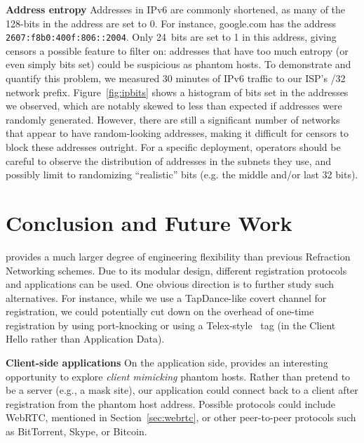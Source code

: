 \documentclass[sigconf]{acmart}
\renewcommand{\paragraph}[1]{\smallskip\noindent\textbf{#1\quad}}
\begin{document}
\paragraph{Address entropy}
Addresses in IPv6 are commonly shortened, as many of the 128-bits in the address are set to 0.
For instance, google.com has the address
\texttt{2607:f8b0:400f:806::2004}. Only 24~bits are set to 1 in this address,
giving censors a possible feature to filter on: addresses that have too much
entropy (or even simply bits set) could be suspicious as phantom hosts. To demonstrate and quantify
this problem, we measured 30 minutes of IPv6 traffic to our ISP's /32 network prefix.
Figure~\ref{fig:ipbits} shows a histogram of bits set in the addresses we observed, which are
notably skewed to less than expected if addresses were randomly generated. However, there
are still a significant number of networks that appear to have random-looking addresses,
making it difficult for censors to block these addresses outright. For a specific deployment,
operators should be careful to observe the distribution of addresses in the subnets they use,
and possibly limit to randomizing ``realistic'' bits (e.g. the middle and/or last 32 bits).







\section{Conclusion and Future Work}

\scheme provides a much larger degree of engineering flexibility than previous
Refraction Networking schemes. Due to its modular design, different registration
protocols and applications can be used. One obvious direction is to further
study such alternatives. For instance, while we use a TapDance-like
covert channel for registration, we could potentially cut down on the overhead of one-time
registration by using port-knocking or using a Telex-style~\cite{telex11} tag (in the Client Hello rather than Application Data).

\paragraph{Client-side applications}
On the application side, \scheme provides an interesting opportunity to explore
\emph{client mimicking} phantom hosts. Rather than pretend to be a server (e.g.,
a mask site), our application could connect back to a client after registration
from the phantom host address. Possible protocols could include WebRTC, mentioned in
Section~\ref{sec:webrtc}, or other peer-to-peer protocols such as BitTorrent,
Skype, or Bitcoin.
\end{document}
